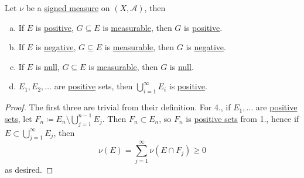 \begin{lemma}\label{lma:lec28-1}
	Let \(\nu\) be a \hyperref[def:signed-measure]{signed measure} on \((X, \mathcal{A})\), then
	\begin{enumerate}[(a)]
		\item If \(E\) is \hyperref[def:positive-set-for-a-signed-measure]{positive}, \(G \subseteq E\) is \hyperref[def:measurable-set]{measurable},
		      then \(G\) is \hyperref[def:positive-set-for-a-signed-measure]{positive}.
		\item If \(E\) is \hyperref[def:negative-set-for-a-signed-measure]{negative}, \(G \subseteq E\) is \hyperref[def:measurable-set]{measurable},
		      then \(G\) is \hyperref[def:negative-set-for-a-signed-measure]{negative}.
		\item If \(E\) is \hyperref[def:null-set-for-a-signed-measure]{null}, \(G \subseteq E\) is \hyperref[def:measurable-set]{measurable},
		      then \(G\) is \hyperref[def:null-set-for-a-signed-measure]{null}.
		\item \(E_1,E_2,\dots\) are \hyperref[def:positive-set-for-a-signed-measure]{positive} sets,
		      then \(\bigcup_{i=1}^\infty E_i\) is \hyperref[def:positive-set-for-a-signed-measure]{positive}.
	\end{enumerate}
\end{lemma}
\begin{proof}
	The first three are trivial from their definition. For 4., if \(E_1, \dots \) are \hyperref[def:positive-set-for-a-signed-measure]{positive sets},
	let \(F_{n} \coloneqq E_n \setminus \bigcup_{j=1}^{n-1} E_j\). Then \(F_n \subset E_n\), so \(F_n\) is \hyperref[def:positive-set-for-a-signed-measure]{positive sets}
	from 1., hence if \(E\subset \bigcup_{j=1}^{\infty} E_{j} \), then
	\[
		\nu (E) = \sum_{j=1}^{\infty} \nu (E \cap F_{j} )\geq 0
	\]
	as desired.
\end{proof}

